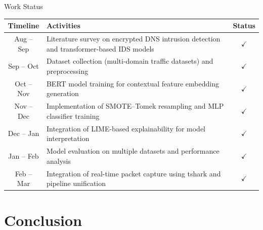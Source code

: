 \documentclass[aspectratio=169,xcolor=dvipsnames]{beamer}
\begin{document}
\begin{frame}{Work Status}
\centering
\small
\begin{tabular}{|c|p{6cm}|c|}
\hline
\textbf{Timeline} & \textbf{Activities} & \textbf{Status} \\
\hline

Aug -- Sep & Literature survey on encrypted DNS intrusion detection and transformer-based IDS models & $\checkmark$ \\
\hline

Sep -- Oct & Dataset collection (multi-domain traffic datasets) and preprocessing & $\checkmark$ \\
\hline

Oct -- Nov & BERT model training for contextual feature embedding generation & $\checkmark$ \\
\hline

Nov -- Dec & Implementation of SMOTE–Tomek resampling and MLP classifier training & $\checkmark$ \\
\hline

Dec -- Jan & Integration of LIME-based explainability for model interpretation & $\checkmark$ \\
\hline

Jan -- Feb & Model evaluation on multiple datasets and performance analysis & $\checkmark$ \\
\hline

Feb -- Mar & Integration of real-time packet capture using tshark and pipeline unification & $\checkmark$ \\
\hline

\end{tabular}

\end{frame}


\section{Conclusion}
\end{document}
